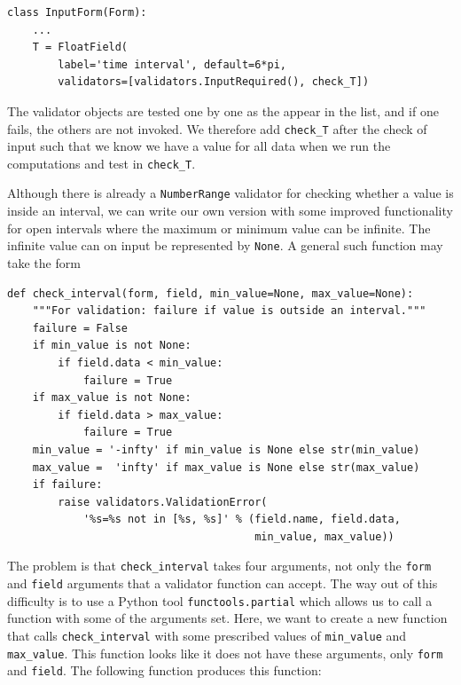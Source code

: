 \documentclass[%
oneside,                 %
final,                   %
10pt]{article}
\begin{document}
\begin{Verbatim}[numbers=none,fontsize=\fontsize{9pt}{9pt},baselinestretch=0.85]
class InputForm(Form):
    ...
    T = FloatField(
        label='time interval', default=6*pi,
        validators=[validators.InputRequired(), check_T])
\end{Verbatim}
The validator
objects are tested one by one as the appear in the list, and if
one fails, the others are not invoked.
We therefore add \Verb!check_T! after the check of input such that we know we
have a value for all data when we run the computations and test
in \Verb!check_T!.

Although there is already a \Verb!NumberRange! validator for checking
whether a value is inside an interval, we can write our own
version with some improved functionality for open intervals where
the maximum or minimum value can be infinite.
The infinite value can on input be represented by \Verb!None!.
A general such function may take the form

\begin{Verbatim}[numbers=none,fontsize=\fontsize{9pt}{9pt},baselinestretch=0.85]
def check_interval(form, field, min_value=None, max_value=None):
    """For validation: failure if value is outside an interval."""
    failure = False
    if min_value is not None:
        if field.data < min_value:
            failure = True
    if max_value is not None:
        if field.data > max_value:
            failure = True
    min_value = '-infty' if min_value is None else str(min_value)
    max_value =  'infty' if max_value is None else str(max_value)
    if failure:
        raise validators.ValidationError(
            '%s=%s not in [%s, %s]' % (field.name, field.data,
                                       min_value, max_value))
\end{Verbatim}


The problem is that \Verb!check_interval! takes four arguments, not only
the \Verb!form! and \Verb!field! arguments that a validator function can accept.
The way out of this difficulty is to use a Python tool \Verb!functools.partial!
which allows us to call a function with some of the arguments set.
Here, we want to create a new function that calls \Verb!check_interval!
with some prescribed values of \Verb!min_value! and \Verb!max_value!.
This function looks like it does not have these arguments, only
\Verb!form! and \Verb!field!. The following function produces this function:
\end{document}
